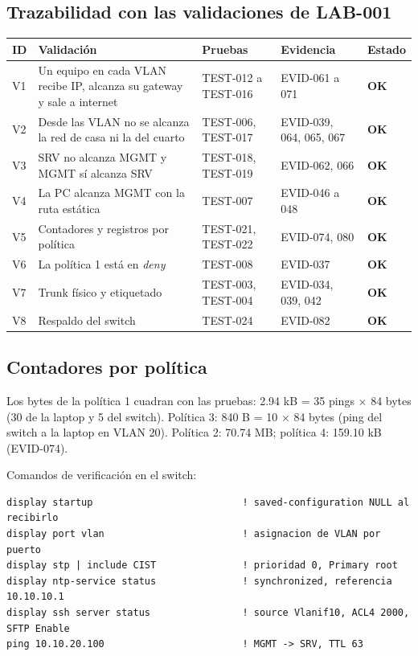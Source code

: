 \documentclass[11pt,a4paper]{article}
\newcommand{\estado}[1]{%
  \ifstrequal{#1}{COMPLETADA}{\textcolor{okgreen}{\textbf{\footnotesize #1}}}{%
  \ifstrequal{#1}{OPERATIVO VALIDADO}{\textcolor{okgreen}{\textbf{\footnotesize #1}}}{%
  \ifstrequal{#1}{OK}{\textcolor{okgreen}{\textbf{\footnotesize #1}}}{%
  \ifstrequal{#1}{RESUELTO}{\textcolor{okgreen}{\textbf{\footnotesize #1}}}{%
  \ifstrequal{#1}{EN CURSO}{\textcolor{amber}{\textbf{\footnotesize #1}}}{%
  \ifstrequal{#1}{REPORTADO}{\textcolor{amber}{\textbf{\footnotesize #1}}}{%
  \ifstrequal{#1}{NO EJECUTADA}{\textcolor{muted}{\textbf{\footnotesize #1}}}{%
  \ifstrequal{#1}{PROPUESTO}{\textcolor{violet}{\textbf{\footnotesize #1}}}{%
  \ifstrequal{#1}{PENDIENTE}{\textcolor{alertred}{\textbf{\footnotesize #1}}}{%
  \textbf{\footnotesize #1}}}}}}}}}}}
\newcommand{\cab}{\rowcolor{light}}
\begin{document}
\subsection{Trazabilidad con las validaciones de LAB-001}
\begin{tabularx}{\textwidth}{L{1.0cm} Z L{3.2cm} L{2.6cm} L{1.4cm}}
  \toprule
  \cab\textbf{ID} & \textbf{Validación} & \textbf{Pruebas} & \textbf{Evidencia} & \textbf{Estado}\\
  \midrule
  V1 & Un equipo en cada VLAN recibe IP, alcanza su gateway y sale a internet & TEST-012 a TEST-016 & EVID-061 a 071 & \estado{OK}\\
  V2 & Desde las VLAN no se alcanza la red de casa ni la del cuarto & TEST-006, TEST-017 & EVID-039, 064, 065, 067 & \estado{OK}\\
  V3 & SRV no alcanza MGMT y MGMT sí alcanza SRV & TEST-018, TEST-019 & EVID-062, 066 & \estado{OK}\\
  V4 & La PC alcanza MGMT con la ruta estática & TEST-007 & EVID-046 a 048 & \estado{OK}\\
  V5 & Contadores y registros por política & TEST-021, TEST-022 & EVID-074, 080 & \estado{OK}\\
  V6 & La política 1 está en \emph{deny} & TEST-008 & EVID-037 & \estado{OK}\\
  V7 & Trunk físico y etiquetado & TEST-003, TEST-004 & EVID-034, 039, 042 & \estado{OK}\\
  V8 & Respaldo del switch & TEST-024 & EVID-082 & \estado{OK}\\
  \bottomrule
\end{tabularx}

\newpage
\subsection{Contadores por política}
Los bytes de la política 1 cuadran con las pruebas: 2.94 kB = 35 pings $\times$ 84 bytes (30 de la laptop y 5 del switch). Política 3: 840 B = 10 $\times$ 84 bytes (ping del switch a la laptop en VLAN 20). Política 2: 70.74 MB; política 4: 159.10 kB (EVID-074).

Comandos de verificación en el switch:
\begin{lstlisting}
display startup                          ! saved-configuration NULL al recibirlo
display port vlan                        ! asignacion de VLAN por puerto
display stp | include CIST               ! prioridad 0, Primary root
display ntp-service status               ! synchronized, referencia 10.10.10.1
display ssh server status                ! source Vlanif10, ACL4 2000, SFTP Enable
ping 10.10.20.100                        ! MGMT -> SRV, TTL 63
\end{lstlisting}
\end{document}
